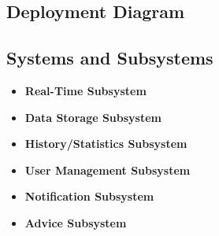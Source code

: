 \subsection{Deployment Diagram}
\subsection{Systems and Subsystems}
\begin{itemize}
	\item \textbf{Real-Time Subsystem}
	\item \textbf{Data Storage Subsystem}
	\item \textbf{History/Statistics Subsystem}
	\item \textbf{User Management Subsystem}
	\item \textbf{Notification Subsystem}
	\item \textbf{Advice Subsystem}
\end{itemize}